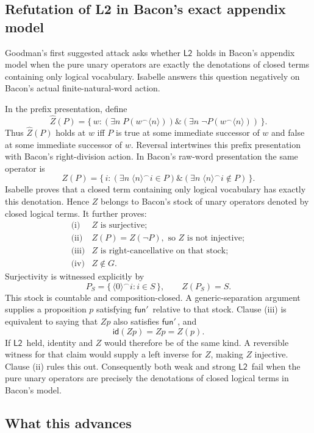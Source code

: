 \documentclass[12pt,leqno]{article}
\newcommand{\AND}{\ensuremath{\mathbin{\&}}}
\theoremstyle{plain}
\theoremstyle{definition}
\newcommand{\funp}{\ensuremath{\mathsf{fun}'\,}}
\newcommand{\Ltwo}{\ensuremath{\mathsf{L2}}}
\begin{document}
\subsection{Refutation of L2 in Bacon's exact appendix model}

Goodman's first suggested attack asks whether \Ltwo\ holds in Bacon's appendix
model when the pure unary operators are exactly the denotations of closed
terms containing only logical vocabulary.  Isabelle answers this question
negatively on Bacon's actual finite-natural-word action.

In the prefix presentation, define
\[
 \widehat Z(P)=
 \{\,w :(\exists n\;P(w^\frown\langle n\rangle))
          \AND(\exists n\;\neg P(w^\frown\langle n\rangle))\,\}.
\]
Thus \(\widehat Z(P)\) holds at \(w\) iff \(P\) is true at some immediate
successor of \(w\) and false at some immediate successor of \(w\).  Reversal
intertwines this prefix presentation with Bacon's right-division action.  In
Bacon's raw-word presentation the same operator is
\[
 Z(P)=
 \{\,i :(\exists n\;\langle n\rangle^\frown i\in P)
          \AND(\exists n\;\langle n\rangle^\frown i\notin P)\,\}.
\]
Isabelle proves that a closed term containing only logical vocabulary has
exactly this denotation.  Hence \(Z\) belongs to Bacon's stock of unary
operators denoted by closed logical terms.  It further proves:
\[
\begin{array}{ll}
\text{(i)}   & Z\text{ is surjective};\\
\text{(ii)}  & Z(P)=Z(\neg P),\text{ so }Z\text{ is not injective};\\
\text{(iii)} & Z\text{ is right-cancellative on that stock};\\
\text{(iv)}  & Z\notin G.
\end{array}
\]
Surjectivity is witnessed explicitly by
\[
 P_S=\{\,\langle 0\rangle^\frown i:i\in S\,\},
 \qquad Z(P_S)=S.
\]
This stock is countable and composition-closed.  A generic-separation
argument supplies a proposition \(p\) satisfying \(\funp\) relative to that
stock.  Clause (iii) is equivalent to saying that \(Zp\) also satisfies
\(\funp\), and
\[
 \mathsf{id}(Zp)=Zp=Z(p).
\]
If \Ltwo\ held, identity and \(Z\) would therefore be of the same kind.  A
reversible witness for that claim would supply a left inverse for \(Z\),
making \(Z\) injective.  Clause (ii) rules this out.  Consequently both weak
and strong \Ltwo\ fail when the pure unary operators are precisely the
denotations of closed logical terms in Bacon's model.

\subsection{What this advances}
\end{document}
